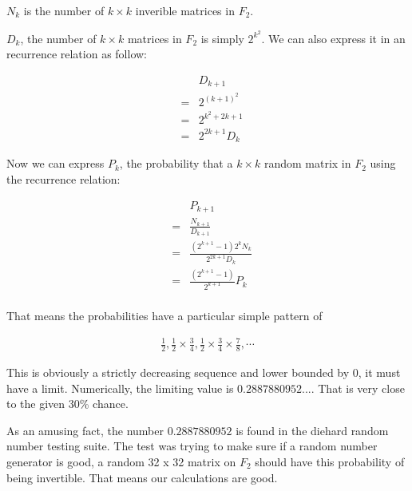 $ N_k $ is the number of $ k \times k $ inverible matrices in $ F_2 $.

$ D_k $, the number of $ k \times k $  matrices in $ F_2 $ is simply $ 2^{k^2} $. We can also express it in an recurrence relation as follow:

\begin{eqnarray*}
  & & D_{k+1} \\
  &=& 2^{(k+1)^2} \\
  &=& 2^{k^2 + 2k + 1} \\
  &=& 2^{2k+1}D_k
\end{eqnarray*}

Now we can express $ P_k $, the probability that a $ k \times k $ random matrix in $ F_2 $ using the recurrence relation:

\begin{eqnarray*}
  & & P_{k+1} \\
  &=& \frac{N_{k+1}}{D_{k+1}} \\
  &=& \frac{(2^{k+1} - 1)2^k N_k }{2^{2k+1}D_k} \\
  &=& \frac{(2^{k+1} - 1)}{2^{k+1}}P_k \\
\end{eqnarray*}

That means the probabilities have a particular simple pattern of

\begin{eqnarray*}
  \frac{1}{2}, \frac{1}{2} \times \frac{3}{4}, \frac{1}{2} \times \frac{3}{4} \times \frac{7}{8}, \cdots
\end{eqnarray*}

This is obviously a strictly decreasing sequence and lower bounded by 0, it must have a limit. Numerically, the limiting value is $ 0.2887880952... $. That is very close to the given 30\% chance.

As an amusing fact, the number $ 0.2887880952 $ is found in the diehard random number testing suite. The test was trying to make sure if a random number generator is good, a random 32 x 32 matrix on $ F_2 $ should have this probability of being invertible. That means our calculations are good.